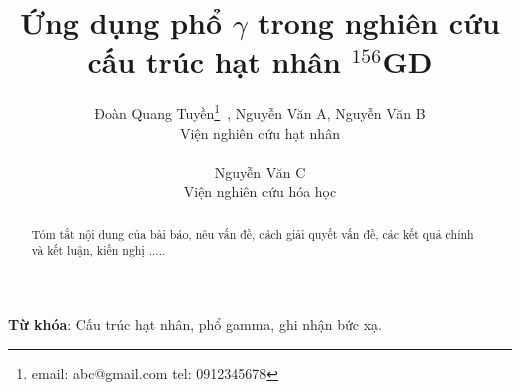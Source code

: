 \documentclass[12pt, a4paper]{article}
\begin{document}
\title{Ứng dụng phổ $\gamma$ trong nghiên cứu cấu trúc hạt nhân $^{156}$GD}

\author{Đoàn Quang Tuyền\thanks{email: abc@gmail.com \newline tel: 0912345678}~, Nguyễn Văn A, Nguyễn Văn B\\
Viện nghiên cứu hạt nhân\\
\\
Nguyễn Văn C\\
Viện nghiên cứu hóa học}
\date{\relax}

\maketitle

\begin{abstract}
Tóm tắt nội dung của bài báo, nêu vấn đề, cách giải quyết vấn đề, các kết quả chính và kết luận, kiến nghị ..... 
\end{abstract}

\textbf{Từ khóa}: Cấu trúc hạt nhân, phổ gamma, ghi nhận bức xạ.
\end{document}
